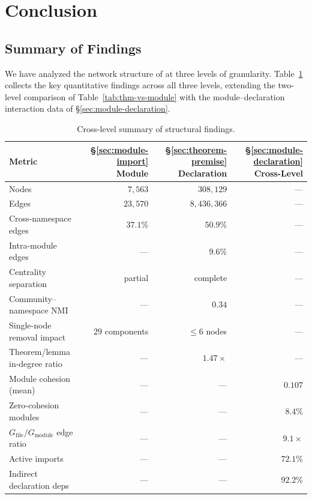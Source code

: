 \section{Conclusion}
\label{sec:conclusion}

\subsection{Summary of Findings}
\label{sec:summary}

We have analyzed the network structure of  at three levels of granularity. Table~\ref{tab:summary} collects the key quantitative findings across all three levels, extending the two-level comparison of Table~\ref{tab:thm-vs-module} with the module--declaration interaction data of \S\ref{sec:module-declaration}.

\begin{table}[ht]
\centering
\caption{Cross-level summary of structural findings.}
\label{tab:summary}
\small
\begin{tabular}{lrrr}
\toprule
Metric & \S\ref{sec:module-import} Module & \S\ref{sec:theorem-premise} Declaration & \S\ref{sec:module-declaration} Cross-Level \\
\midrule
Nodes                      & $7{,}563$        & $308{,}129$     & --- \\
Edges                      & $23{,}570$       & $8{,}436{,}366$ & --- \\
Cross-namespace edges       & $37.1\%$         & $50.9\%$        & --- \\
Intra-module edges          & ---              & $9.6\%$         & --- \\
Centrality separation       & partial          & complete        & --- \\
Community--namespace NMI   & ---              & $0.34$          & --- \\
Single-node removal impact & $29$ components  & $\le 6$ nodes   & --- \\
Theorem/lemma in-degree ratio & ---            & $1.47\times$    & --- \\
Module cohesion (mean)     & ---              & ---             & $0.107$ \\
Zero-cohesion modules      & ---              & ---             & $8.4\%$ \\
$G_{\mathrm{file}}/G_{\mathrm{module}}$ edge ratio & ---  & ---  & $9.1\times$ \\
Active imports             & ---              & ---             & $72.1\%$ \\
Indirect declaration deps  & ---              & ---             & $92.2\%$ \\
\bottomrule
\end{tabular}
\end{table}

